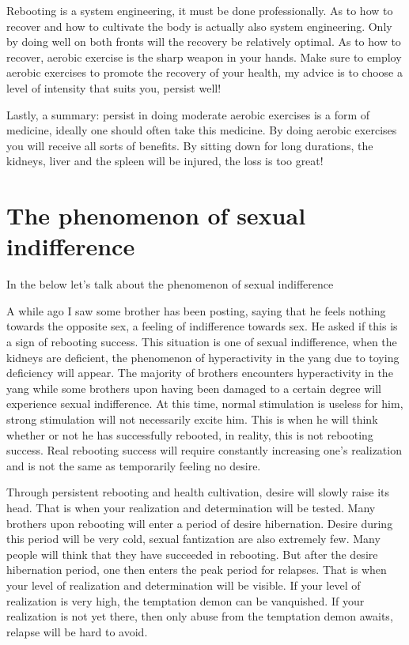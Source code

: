 \documentclass[
]{book}
\begin{document}
Rebooting is a system engineering, it must be done professionally. As to how to recover and how to cultivate the body is actually also system engineering. Only by doing well on both fronts will the recovery be relatively optimal. As to how to recover, aerobic exercise is the sharp weapon in your hands. Make sure to employ aerobic exercises to promote the recovery of your health, my advice is to choose a level of intensity that suits you, persist well!

Lastly, a summary: persist in doing moderate aerobic exercises is a form of medicine, ideally one should often take this medicine. By doing aerobic exercises you will receive all sorts of benefits. By sitting down for long durations, the kidneys, liver and the spleen will be injured, the loss is too great!

\hypertarget{the-phenomenon-of-sexual-indifference}{%
\section{The phenomenon of sexual indifference}\label{the-phenomenon-of-sexual-indifference}}

In the below let's talk about the phenomenon of sexual indifference

A while ago I saw some brother has been posting, saying that he feels nothing towards the opposite sex, a feeling of indifference towards sex. He asked if this is a sign of rebooting success. This situation is one of sexual indifference, when the kidneys are deficient, the phenomenon of hyperactivity in the yang due to toying deficiency will appear. The majority of brothers encounters hyperactivity in the yang while some brothers upon having been damaged to a certain degree will experience sexual indifference. At this time, normal stimulation is useless for him, strong stimulation will not necessarily excite him. This is when he will think whether or not he has successfully rebooted, in reality, this is not rebooting success. Real rebooting success will require constantly increasing one's realization and is not the same as temporarily feeling no desire.

Through persistent rebooting and health cultivation, desire will slowly raise its head. That is when your realization and determination will be tested. Many brothers upon rebooting will enter a period of desire hibernation. Desire during this period will be very cold, sexual fantization are also extremely few. Many people will think that they have succeeded in rebooting. But after the desire hibernation period, one then enters the peak period for relapses. That is when your level of realization and determination will be visible. If your level of realization is very high, the temptation demon can be vanquished. If your realization is not yet there, then only abuse from the temptation demon awaits, relapse will be hard to avoid.
\end{document}
